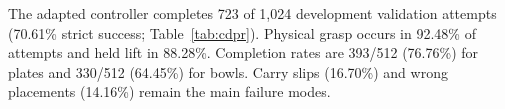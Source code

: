 The adapted controller completes 723 of 1,024 development validation attempts (70.61\% strict success; Table~\ref{tab:cdpr}). Physical grasp occurs in 92.48\% of attempts and held lift in 88.28\%. Completion rates are 393/512 (76.76\%) for plates and 330/512 (64.45\%) for bowls. Carry slips (16.70\%) and wrong placements (14.16\%) remain the main failure modes.

